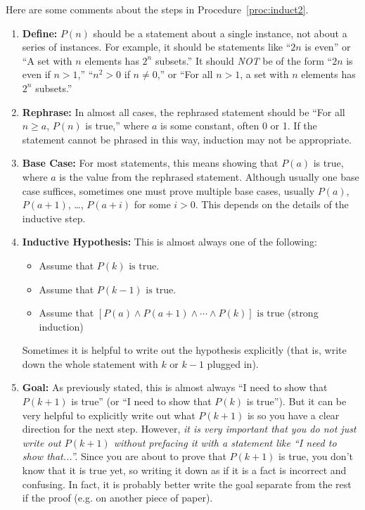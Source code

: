 Here are some comments about the steps in Procedure~\ref{proc:induct2}.

\begin{enumerate}
\item{\bf Define:} 
$P(n)$ should be a statement
about a single instance, not about a series of instances.  For example,
it should be statements like 
``$2 n$ is even''  or 
``A set with $n$ elements has $2^n$ subsets.''
It should {\em NOT} be of the form 
``$2 n$ is even if $n>1$,'' ``$n^2>0$ if $n\neq 0$,''
or ``For all $n>1$, a set with $n$ elements has $2^n$ subsets.''
\item{\bf Rephrase:} 
In almost all cases, the rephrased statement should be 
``For all $n\geq a$, $P(n)$ is true,'' where $a$ is some constant,
often 0 or 1. If the statement cannot be phrased in this way, induction may
not be appropriate.
\item{\bf Base Case:} 
For most statements, this means showing that $P(a)$ is true, where $a$ is
the value from the rephrased statement.  
Although usually one base case suffices, sometimes one must prove multiple
base cases, usually $P(a)$, $P(a+1)$, \ldots, $P(a+i)$ for some $i>0$.
This depends on the details of the inductive step.
\item{\bf Inductive Hypothesis:}
This is almost always one of the following: 
\begin{itemize}
\item
Assume that $P(k) \mbox{ is true}$.
\item
Assume that $P(k-1) \mbox{ is true}$.
\item
Assume that $[P(a)\wedge P(a+1)\wedge \cdots \wedge P(k)] \mbox{ is true}$ (strong induction)
\end{itemize}
Sometimes it is helpful to write out the hypothesis explicitly (that is,
write down the whole statement with $k$ or $k-1$ plugged in).

\item{\bf Goal:}
As previously stated, this is almost always ``I need to show that $P(k+1)$ is true'' 
(or ``I need to show that $P(k)$ is true'').
But it can be very helpful to explicitly write out what $P(k+1)$ is so you have a clear
direction for the next step.  However, {\em it is very important that you do not just
write out $P(k+1)$ without prefacing it with a statement like ``I need to show that...''.}
Since you are about to prove that $P(k+1)$ is true, you don't know that it is true
yet, so writing it down as if it is a fact is incorrect and confusing.
In fact, it is probably better write the goal separate from the rest if the proof
(e.g. on another piece of paper).  


\end{enumerate}
